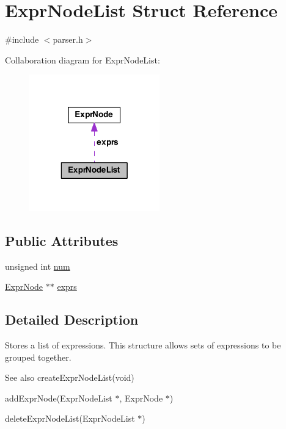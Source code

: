 \hypertarget{struct_expr_node_list}{\section{Expr\-Node\-List Struct Reference}
\label{struct_expr_node_list}
}


{\ttfamily \#include $<$parser.\-h$>$}



Collaboration diagram for Expr\-Node\-List\-:
\nopagebreak
\begin{figure}[H]
\begin{center}
\leavevmode
\includegraphics[width=160pt]{struct_expr_node_list__coll__graph}
\end{center}
\end{figure}
\subsection*{Public Attributes}
\begin{DoxyCompactItemize}
\item 
unsigned int \hyperlink{struct_expr_node_list_a60f9bbe230725287369033df733a2b04}{num}
\item 
\hyperlink{struct_expr_node}{Expr\-Node} $\ast$$\ast$ \hyperlink{struct_expr_node_list_a10ae95f2facec652ba79e0bb5c9298c1}{exprs}
\end{DoxyCompactItemize}


\subsection{Detailed Description}
Stores a list of expressions. This structure allows sets of expressions to be grouped together.

\begin{DoxySeeAlso}{See also}
create\-Expr\-Node\-List(void) 

add\-Expr\-Node(\-Expr\-Node\-List $\ast$, Expr\-Node $\ast$) 

delete\-Expr\-Node\-List(\-Expr\-Node\-List $\ast$) 
\end{DoxySeeAlso}



